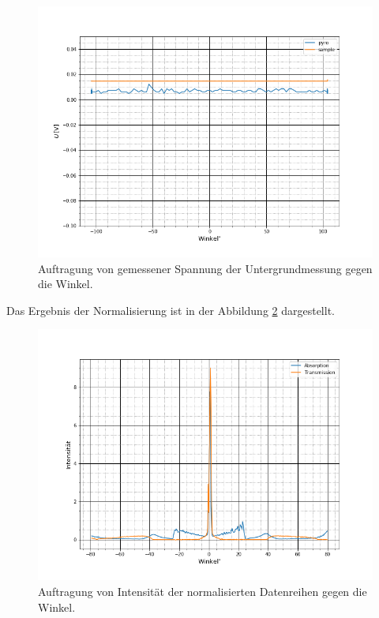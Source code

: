 \begin{figure}[h]
	\centering
	\label{untergrund}
	\includegraphics[scale=0.5]{Bilder/Hintergrund}
	\caption{\small Auftragung von gemessener Spannung der  Untergrundmessung gegen die Winkel.}
\end{figure}

Das Ergebnis der Normalisierung ist in der Abbildung \ref{normalized} dargestellt.

\begin{figure}[h]
	\centering
	\label{normalized}
	\includegraphics[scale=0.5]{Bilder/normalized}
	\caption{\small Auftragung von Intensität der normalisierten Datenreihen gegen die  Winkel.}
\end{figure}

